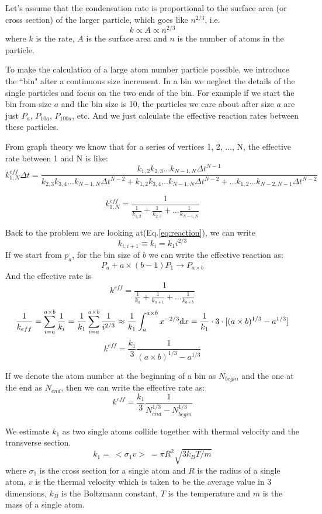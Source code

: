 \documentclass{article}
\begin{document}
Let's assume that the condensation rate is proportional to the surface area
(or cross section) of the larger particle, which goes like $n^{2/3}$, i.e.
\[
k \propto A \propto n^{2/3}
\]
where $k$ is the rate, $A$ is the surface area and $n$ is the number of atoms
in the particle.

To make the calculation of a large atom number particle possible, we introduce
the ``bin" after a continuous size increment. In a bin we neglect the details 
of the single particles and focus on the
two ends of the bin. For example if we start the bin from size $a$ and the bin 
size is 10, the particles we care about after size $a$
are just $P_a$, $P_{10a}$, $P_{100a}$, etc. 
And we just calculate the effective reaction rates between these particles.

From graph theory we know that for a series of vertices 1, 2, ..., N, the
effective rate between 1 and N is like:
\[
k_{1,N}^{eff} \Delta t = \frac 
  { k_{1,2}k_{2,3}...k_{N-1,N}\Delta t^{N-1} }
  { 
    k_{2,3}k_{3,4}...k_{N-1,N}\Delta t^{N-2} +
    k_{1,2}k_{3,4}...k_{N-1,N}\Delta t^{N-2} +
    ...
    k_{1,2}...k_{N-2,N-1}\Delta t^{N-2}
  }
\]

\[
k_{1,N}^{eff} = \frac {1}
  { 
    \frac{1}{k_{1,2}} +
    \frac{1}{k_{2,3}} +
    ...
    \frac{1}{k_{N-1,N}}
  }
\]

Back to the problem we are looking at(Eq.\ref{eq:reaction}), we can write
\[
k_{i,i+1} \equiv k_i = k_1 i^{2/3}
\]
If we start from $p_a$, for the bin size of $b$ we can write the effective
reaction as:
\[
P_a + a\times (b-1) P_1 \to P_{a\times b}
\]
And the effective rate is
\[
k^{eff} = \frac {1}
  {
    \frac {1} {k_{a}} +
    \frac {1} {k_{a+1}} +
    ...
    \frac {1} {k_{a\times b}}
  }
\]
\[
\frac {1} {k_{eff}} =
  \sum_{i=a}^{a\times b} \frac {1} {k_i} =
  \frac{1}{k_1} \sum_{i=a}^{a\times b} \frac {1} {i^{2/3}} \approx
  \frac{1}{k_1} \int_a^{a\times b} x^{-2/3} {\rm d} x =
  \frac{1}{k_1} \cdot 3 \cdot [(a\times b)^{1/3} - a^{1/3}]
\]
\[
k^{eff} = \frac{k_1}{3} 
  \frac{1}{ (a\times b)^{1/3} - a^{1/3} }
\]

If we denote the atom number at the beginning of a bin as $N_{begin}$ and
the one at the end as $N_{end}$, then we can write the effective rate as:
\begin{equation}
k^{eff} = \frac{k_1}{3} 
  \frac{1}{ N_{end}^{1/3} - N_{begin}^{1/3} }
\label{eq:rate}
\end{equation}

We estimate $k_1$ as two single atoms collide together with thermal velocity
and the transverse section.
\begin{equation}
k_1 = \: <\! \sigma_1 v\! > \: = \pi R^2 \sqrt{3k_BT/m}
\label{eq:k1}
\end{equation}
where $\sigma_1$ is the cross section for a single atom and $R$ is the radius
of a single atom, $v$ is the thermal velocity which is taken to be the average
value in 3 dimensions, $k_B$ is the Boltzmann constant, $T$ is the temperature
and $m$ is the mass of a single atom.
\end{document}
